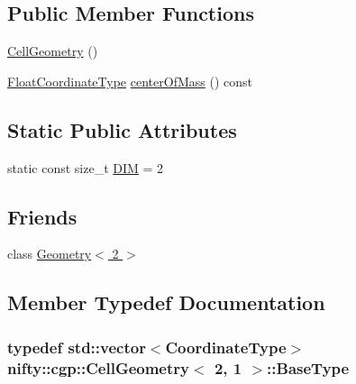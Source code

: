 \subsection*{Public Member Functions}
\begin{DoxyCompactItemize}
\item 
\hyperlink{classnifty_1_1cgp_1_1CellGeometry_3_012_00_011_01_4_ae525aaf64790b4c76c17208a13588101}{Cell\+Geometry} ()
\item 
\hyperlink{classnifty_1_1cgp_1_1CellGeometry_3_012_00_011_01_4_aa894ce050b43284dac01b3963e2e1e47}{Float\+Coordinate\+Type} \hyperlink{classnifty_1_1cgp_1_1CellGeometry_3_012_00_011_01_4_ae8510d5f8494ee259cd105eb8342a494}{center\+Of\+Mass} () const 
\end{DoxyCompactItemize}
\subsection*{Static Public Attributes}
\begin{DoxyCompactItemize}
\item 
static const size\+\_\+t \hyperlink{classnifty_1_1cgp_1_1CellGeometry_3_012_00_011_01_4_a42d125e23384bc4a770893276750d9d1}{D\+I\+M} = 2
\end{DoxyCompactItemize}
\subsection*{Friends}
\begin{DoxyCompactItemize}
\item 
class \hyperlink{classnifty_1_1cgp_1_1CellGeometry_3_012_00_011_01_4_adfd68abfc6c19d6cc9ac2eb46fcfa819}{Geometry$<$ 2 $>$}
\end{DoxyCompactItemize}


\subsection{Member Typedef Documentation}
\hypertarget{classnifty_1_1cgp_1_1CellGeometry_3_012_00_011_01_4_a10f7d7a27ef9080c3a94fc69a258c55e}{}
\subsubsection[{Base\+Type}]{\setlength{\rightskip}{0pt plus 5cm}typedef std\+::vector$<${\bf Coordinate\+Type}$>$ {\bf nifty\+::cgp\+::\+Cell\+Geometry}$<$ 2, 1 $>$\+::{\bf Base\+Type}}\label{classnifty_1_1cgp_1_1CellGeometry_3_012_00_011_01_4_a10f7d7a27ef9080c3a94fc69a258c55e}
\hypertarget{classnifty_1_1cgp_1_1CellGeometry_3_012_00_011_01_4_a61e8ffb089e3ca4bf7998e77dfc278bc}{}
